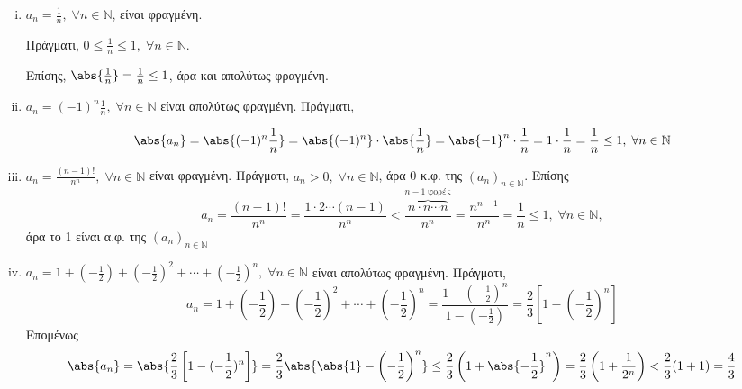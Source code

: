 \documentclass[main.tex]{subfiles}
\begin{document}
\begin{examples}
\item {}  
    \begin{enumerate}[i)]
        \item $ a_{n}= \frac{1}{n}, \; \forall n \in \mathbb{N} $, είναι φραγμένη.
            
            Πράγματι, $ 0 \leq \frac{1}{n} \leq 1, \; \forall n \in \mathbb{N} $. 

            Επίσης, $ \abs{\frac{1}{n}} = \frac{1}{n} \leq 1 $, άρα και 
            απολύτως φραγμένη.
        \item $ a_{n}=(-1)^{n} \frac{1}{n}, \; \forall n \in \mathbb{N} $ 
            είναι απολύτως φραγμένη. Πράγματι,

            \[
                \abs{a_{n}} = \abs{(-1)^{n} \frac{1}{n}} = \abs{(-1)^{n}} 
                \cdot \abs{\frac{1}{n}} = \abs{-1}^{n} \cdot \frac{1}{n}
                = 1 \cdot \frac{1}{n} = \frac{1}{n} \leq 1, \; \forall n \in 
                \mathbb{N}
             \] 

         \item $ a_{n}= \frac{(n-1)!}{n^{n}}, \; \forall n \in \mathbb{N} $
             είναι φραγμένη. Πράγματι, $ a_{n} > 0, \; \forall n \in 
             \mathbb{N}$, άρα 0 κ.φ. της $( a_{n})_{n \in \mathbb{N}} $. 
             Επίσης 
             \[
                 a_{n}= \frac{(n-1)!}{n^{n}} = \frac{1 \cdot 2 \cdots
                 (n-1)}{n^{n}} < \frac{\overbrace{n \cdot n \cdots n}
             ^{n-1 \; \text{φορές}}}{n^{n}} = \frac{n^{n-1}}{n^{n}} =
             \frac{1}{n} \leq 1, \; \forall n \in \mathbb{N},
         \] άρα το 1 είναι α.φ. της $ (a_{n})_{n \in \mathbb{N}} $ 

     \item $ a_{n}= 1 + \left(- \frac{1}{2} \right) + \left(- 
         \frac{1}{2}\right)^{2} + \cdots + \left(-\frac{1}{2} \right) ^{n}, 
         \; \forall n \in \mathbb{N} $ είναι απολύτως φραγμένη. Πράγματι, 
         \[ a_{n} = 1 + \left(- \frac{1}{2}\right) + \left(- \frac{1}{2} 
             \right)^{2} + \cdots + \left(- \frac{1}{2} \right)^{n} = 
             \frac{1 - (- \frac{1}{2} )^{n}}{1 - (- \frac{1}{2})} = 
         \frac{2}{3} \left[1 - \left(- \frac{1}{2} \right)^{n}\right] \]
         Επομένως
         \[
             \abs{a_{n}} = \abs{\frac{2}{3} \left[1-(- \frac{1}{2} )^{n}\right]} = 
             \frac{2}{3} \abs{\abs{1} - \left(- \frac{1}{2}\right)^{n}} \leq 
             \frac{2}{3} \left(1 + \abs{-\frac{1}{2} }^{n} \right) = 
             \frac{2}{3} \left(1+ \frac{1}{2^{n}}\right) < \frac{2}{3}
             (1+1) = \frac{4}{3} 
          \] 


\end{enumerate}
\end{examples}
\end{document}
